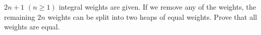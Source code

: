 $2n + 1$ $(n \geq 1)$ integral weights are given. If we remove any of the weights, the remaining $2n$ weights can be split into two heaps of equal weights. Prove that all weights are equal.
